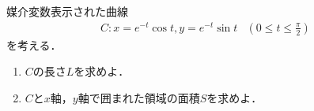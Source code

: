 媒介変数表示された曲線
\begin{align*}
  C: x=e^{-t}\cos t, y=e^{-t}\sin t & \left(0\le t\le \frac{\pi}{2}\right)
\end{align*}
を考える．
\begin{enumerate}
  \item $C$の長さ$L$を求めよ．
  \item $C$と$x$軸，$y$軸で囲まれた領域の面積$S$を求めよ．
\end{enumerate}